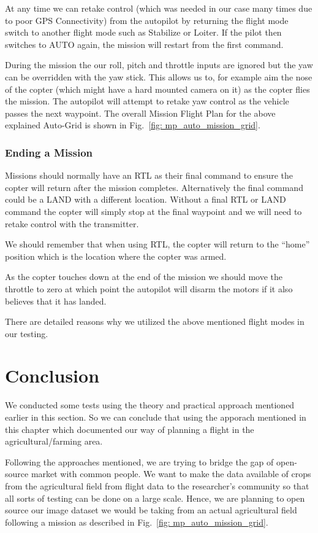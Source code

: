 At any time we can retake control (which was needed in our case many times due to poor GPS Connectivity) from the autopilot by returning the flight mode switch to another flight mode such as Stabilize or Loiter. If the pilot then switches to AUTO again, the mission will restart from the first command.

During the mission the our roll, pitch and throttle inputs are ignored but the yaw can be overridden with the yaw stick. This allows us to, for example aim the nose of the copter (which might have a hard mounted camera on it) as the copter flies the mission. The autopilot will attempt to retake yaw control as the vehicle passes the next waypoint. The overall Mission Flight Plan for the above explained Auto-Grid is shown in Fig.~\ref{fig: mp_auto_mission_grid}.

\subsubsection{Ending a Mission}

Missions should normally have an RTL as their final command to ensure the copter will return after the mission completes. Alternatively the final command could be a LAND with a different location. Without a final RTL or LAND command the copter will simply stop at the final waypoint and we will need to retake control with the transmitter.

We should remember that when using RTL, the copter will return to the “home” position which is the location where the copter was armed.

As the copter touches down at the end of the mission we should move the throttle to zero at which point the autopilot will disarm the motors if it also believes that it has landed.



There are detailed reasons why we utilized the above mentioned flight modes in our testing. 



 
\section{Conclusion}

We conducted some tests using the theory and practical approach mentioned earlier in this section. So we can conclude that using the apporach mentioned in this chapter which documented our way of planning a flight in the agricultural/farming area.

Following the approaches mentioned, we are trying to bridge the gap of open-source market with common people. We want to make the data available of crops from the agricultural field from flight data to the researcher's community so that all sorts of testing can be done on a large scale. Hence, we are planning to open source our image dataset we would be taking from an actual agricultural field following a mission as described in Fig.~\ref{fig: mp_auto_mission_grid}.




